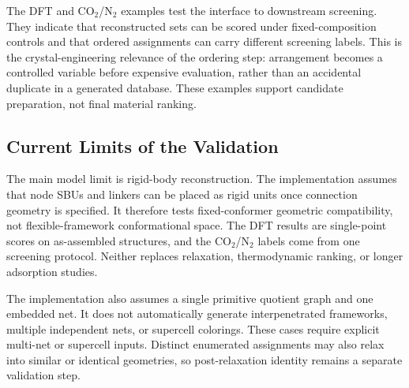 \documentclass[pdflatex,sn-mathphys-num]{sn-jnl}
\theoremstyle{thmstyleone}%
\begin{document}
The DFT and CO$_2$/N$_2$ examples test the interface to downstream screening. They indicate that reconstructed sets can be scored under fixed-composition controls and that ordered assignments can carry different screening labels. This is the crystal-engineering relevance of the ordering step: arrangement becomes a controlled variable before expensive evaluation, rather than an accidental duplicate in a generated database. These examples support candidate preparation, not final material ranking.

\subsection*{Current Limits of the Validation}
\label{sec:limits}
The main model limit is rigid-body reconstruction. The implementation assumes that node SBUs and linkers can be placed as rigid units once connection geometry is specified. It therefore tests fixed-conformer geometric compatibility, not flexible-framework conformational space. The DFT results are single-point scores on as-assembled structures, and the CO$_2$/N$_2$ labels come from one screening protocol. Neither replaces relaxation, thermodynamic ranking, or longer adsorption studies.

The implementation also assumes a single primitive quotient graph and one embedded net. It does not automatically generate interpenetrated frameworks, multiple independent nets, or supercell colorings. These cases require explicit multi-net or supercell inputs. Distinct enumerated assignments may also relax into similar or identical geometries, so post-relaxation identity remains a separate validation step.
\end{document}
